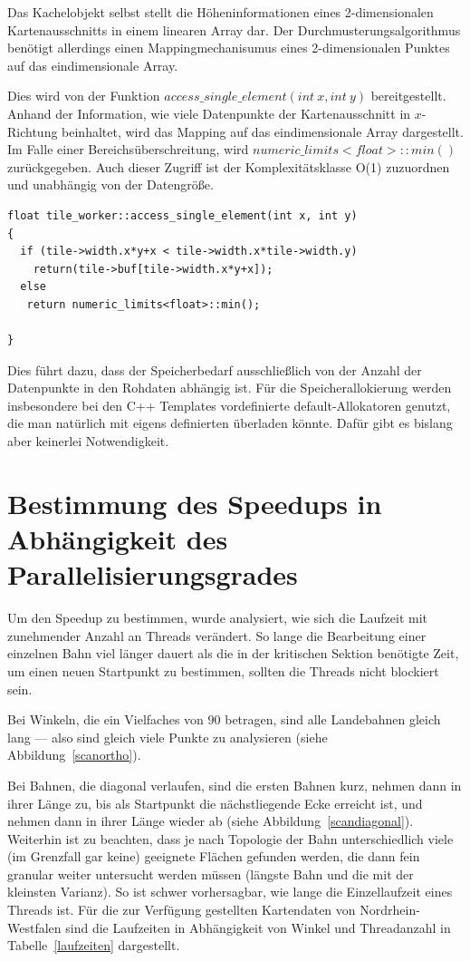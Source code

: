 \documentclass[10pt,a4paper]{report}
\begin{document}
Das Kachelobjekt selbst stellt die Höheninformationen eines 2-dimensionalen Kartenausschnitts in einem linearen Array dar. Der Durchmusterungsalgorithmus benötigt allerdings einen Mappingmechanisumus eines 2-dimensionalen Punktes auf das eindimensionale Array.

Dies wird von der Funktion $access\_single\_element(int\ x, int\ y)$ bereitgestellt. Anhand der Information, wie viele Datenpunkte der Kartenausschnitt in $x$-Richtung beinhaltet, wird das Mapping auf das eindimensionale Array dargestellt. Im Falle einer Bereichsüberschreitung, wird $numeric\_limits<float>::min()$ zurückgegeben.
Auch dieser Zugriff ist der Komplexitätsklasse O(1) zuzuordnen und unabhängig von der Datengröße.

\begin{lstlisting}
float tile_worker::access_single_element(int x, int y)
{
  if (tile->width.x*y+x < tile->width.x*tile->width.y)
    return(tile->buf[tile->width.x*y+x]);
  else
   return numeric_limits<float>::min();

}
\end{lstlisting}

Dies führt dazu, dass der Speicherbedarf ausschließlich von der Anzahl der Datenpunkte in den Rohdaten abhängig ist. Für die Speicherallokierung werden insbesondere bei den C++ Templates vordefinierte default-Allokatoren genutzt, die man natürlich mit eigens definierten überladen könnte. Dafür gibt es bislang aber keinerlei Notwendigkeit.
 


\section{Bestimmung des Speedups in Abhängigkeit des Parallelisierungsgrades}

Um den Speedup zu bestimmen, wurde analysiert, wie sich die Laufzeit mit zunehmender Anzahl an Threads verändert. So lange die Bearbeitung einer einzelnen Bahn viel länger dauert als die in der kritischen Sektion benötigte Zeit, um einen neuen Startpunkt zu bestimmen, sollten die Threads nicht blockiert sein.

Bei Winkeln, die ein Vielfaches von $90$ betragen, sind alle Landebahnen gleich lang --- also sind gleich viele Punkte zu analysieren (siehe Abbildung~\ref{scanortho}).

Bei Bahnen, die diagonal verlaufen, sind die ersten Bahnen kurz, nehmen dann in ihrer Länge zu, bis als Startpunkt die nächstliegende Ecke erreicht ist, und nehmen dann in ihrer Länge wieder ab (siehe Abbildung~\ref{scandiagonal}). 
Weiterhin ist zu beachten, dass je nach Topologie der Bahn unterschiedlich viele (im Grenzfall gar keine) geeignete Flächen gefunden werden, die dann fein granular weiter untersucht werden müssen (längste Bahn und die mit der kleinsten Varianz). So ist schwer vorhersagbar, wie lange die Einzellaufzeit eines Threads ist.
Für die zur Verfügung gestellten Kartendaten von Nordrhein-Westfalen sind die Laufzeiten in Abhängigkeit von Winkel und Threadanzahl in Tabelle~\ref{laufzeiten} dargestellt.
\end{document}
